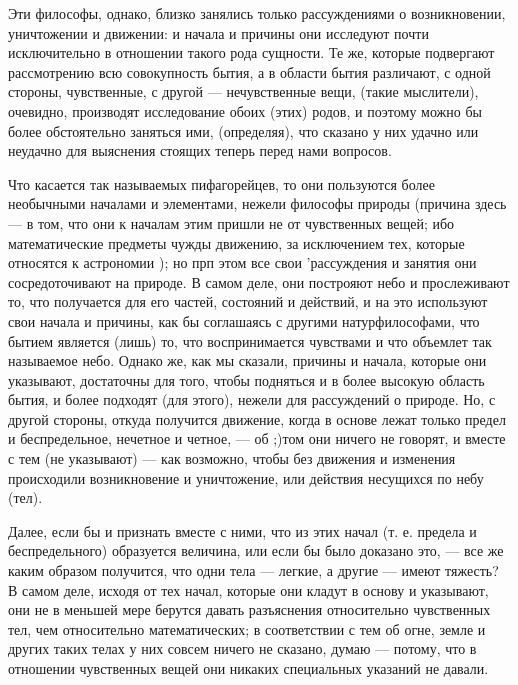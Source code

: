 \documentclass{article}
\begin{document}
Эти философы, однако, близко занялись только рассуждениями о возникновении, уничтожении и движении: и начала и причины они исследуют почти исключительно в отношении такого рода сущности.
\footnotemark[5]
Те же, которые подвергают рассмотрению всю совокупность бытия, а в области бытия различают, с одной стороны, чувственные, с другой --- нечувственные вещи, (такие мыслители), очевидно, производят исследование обоих (этих) родов, и поэтому можно бы более обстоятельно заняться ими, (определяя), что сказано у них удачно или неудачно для выяснения стоящих теперь перед нами вопросов.

Что касается так называемых пифагорейцев, то они пользуются более необычными началами и элементами, нежели философы природы (причина здесь --- в том, что они к началам этим пришли не от чувственных вещей; ибо математические предметы чужды движению, за исключением тех, которые относятся к астрономии ); но прп этом все свои 'рассуждения и занятия они сосредоточивают на природе. В самом деле, они построяют небо и прослеживают то, что получается для его частей, состояний и действий, и на это используют свои начала и причины, как бы соглашаясь с другими натурфилософами, что бытием является (лишь) то, что воспринимается чувствами и что объемлет так называемое небо. Однако же, как мы сказали, причины и начала, которые они указывают, достаточны для того, чтобы подняться и в более высокую область бытия, и более подходят (для этого), нежели для рассуждений о природе. Но, с другой стороны, откуда получится движение, когда в основе лежат только предел и беспредельное, нечетное и четное, --- об ;)том они ничего не говорят, и вместе с тем (не указывают) --- как возможно, чтобы без движения и изменения происходили возникновение и уничтожение, или действия несущихся по небу (тел).

Далее, если бы и признать вместе с ними, что из этих начал (т. е. предела и беспредельного) образуется величина, или если бы было доказано это, --- все же каким образом получится, что одни тела --- легкие, а другие --- имеют тяжесть? В самом деле, исходя от тех начал, которые они кладут в основу и указывают, они не в меньшей мере берутся давать разъяснения относительно чувственных тел, чем относительно математических; в соответствии с тем об огне, земле и других таких телах у них совсем ничего не сказано, думаю --- потому, что в отношении чувственных вещей они никаких специальных указаний не давали.
\end{document}
